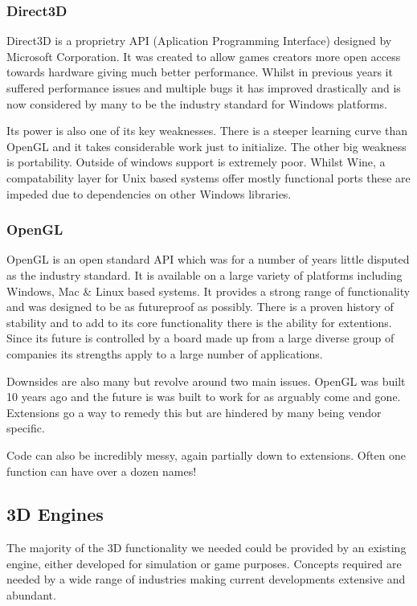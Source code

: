 \subsubsection{Direct3D}

Direct3D is a proprietry API (Aplication Programming Interface) designed
by Microsoft Corporation. It was created to allow games creators more
open access towards hardware giving much better performance. Whilst
in previous years it suffered performance issues and multiple bugs
it has improved drastically and is now considered by many to be the
industry standard for Windows platforms\cite{Roy2002}.

Its power is also one of its key weaknesses. There is a steeper learning
curve than OpenGL and it takes considerable work just to initialize.
The other big weakness is portability. Outside of windows support
is extremely poor. Whilst Wine, a compatability layer for Unix based
systems offer mostly functional ports these are impeded due to dependencies
on other Windows libraries.


\subsubsection{OpenGL}

OpenGL is an open standard API which was for a number of years little
disputed as the industry standard. It is available on a large variety
of platforms including Windows, Mac \& Linux based systems. It provides
a strong range of functionality and was designed to be as futureproof
as possibly. There is a proven history of stability and to add to
its core functionality there is the ability for extentions. Since
its future is controlled by a board made up from a large diverse group
of companies its strengths apply to a large number of applications.

Downsides are also many but revolve around two main issues. OpenGL
was built 10 years ago and the future is was built to work for as
arguably come and gone. Extensions go a way to remedy this but are
hindered by many being vendor specific.

Code can also be incredibly messy, again partially down to extensions.
Often one function can have over a dozen names!


\subsection{3D Engines}

The majority of the 3D functionality we needed could be provided by
an existing engine, either developed for simulation or game purposes.
Concepts required are needed by a wide range of industries making
current developments extensive and abundant.

